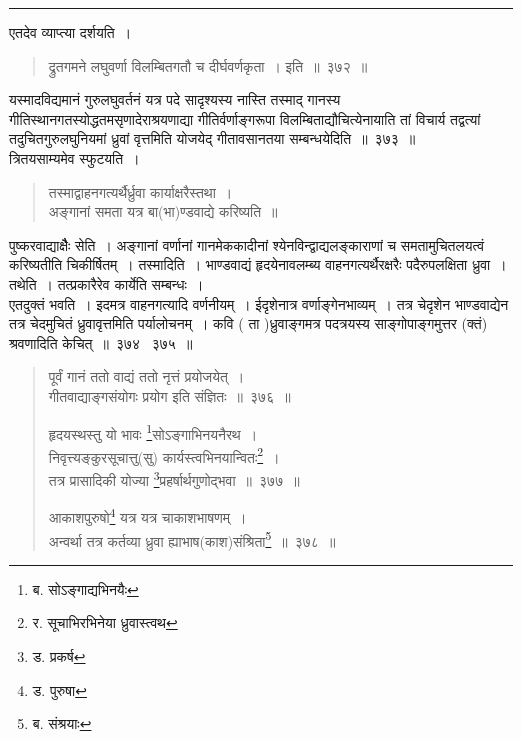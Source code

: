 \documentclass[11pt, openany]{book}
\begin{document}
\hrule

\vspace{2mm}
एतदेव व्याप्त्या दर्शयति~। 

\begin{quote}
{\qt द्रुतगमने लघुवर्णा विलम्बितगतौ च दीर्घवर्णकृता~। इति~॥~३७२~॥}
\end{quote}

यस्मादविद्यमानं गुरुलघुवर्तनं यत्र पदे सादृश्यस्य नास्ति {\qtt तस्माद्} गानस्य गीतिस्थानगतस्योद्धतमसृणादेराश्रयणाद्या गीतिर्वर्णाङ्गरूपा विलम्बिताद्यौचित्येनायाति तां विचार्य तद्वत्यां तदुचितगुरुलघुनियमां ध्रुवां वृत्तमिति योजयेद् गीतावसानतया सम्बन्धयेदिति~॥~३७३~॥\\

 त्रितयसाम्यमेव स्फुटयति~। \\

\begin{quote}
{\qt तस्माद्वाहनगत्यर्थैर्ध्रुवा कार्याक्षरैस्तथा~। \\
 अङ्गानां समता यत्र बा(भा)ण्डवाद्ये करिष्यति~॥}
\end{quote}

पुष्करवाद्याक्षैैः सेति~। {\qtt अङ्गानां} वर्णानां गानमेककादीनां श्येनविन्द्वाद्यलङ्काराणां च {\qtt समतामुचितल}यत्वं करिष्यतीति चिकीर्षितम्~। {\qtt तस्मादिति}~। भाण्डवाद्यं हृदयेनावलम्ब्य वाहनगत्यर्थैरक्षरैः पदैरुपलक्षिता ध्रुवा~। तथेति~। तत्प्रकारैरेव {\qtt कार्येति} सम्बन्धः~।\\

एतदुक्तं भवति~। इदमत्र वाहनगत्यादि वर्णनीयम्~। ईदृशेनात्र वर्णाङ्गेनभाव्यम्~। तत्र चेदृशेन भाण्डवाद्येन तत्र चेदमुचितं ध्रुवावृत्तमिति पर्यालोचनम्~। कवि ( ता )ध्रुवाङ्गमत्र पदत्रयस्य साङ्गोपाङ्गमुत्तर (क्तं) श्रवणादिति केचित्~॥~३७४ \textendash\ ३७५~॥

\newpage

\begin{quote}
{\na पूर्वं गानं ततो वाद्यं ततो नृत्तं प्रयोजयेत्~।\\
 गीतवाद्याङ्गसंयोगः प्रयोग इति संज्ञितः~॥~३७६~॥
 
 हृदयस्थस्तु यो भावः \renewcommand{\thefootnote}{1}\footnote{ब. सोऽङ्गाद्यभिनयैः}सोऽङ्गाभिनयनैरथ~।\\
 निवृत्त्यङ्कुरसूचात्तु(सु) कार्यस्त्वभिनयान्वितः\renewcommand{\thefootnote}{2}\footnote{र. सूचाभिरभिनेया ध्रुवास्त्वथ}~।\\
 तत्र प्रासादिकी योज्या \renewcommand{\thefootnote}{3}\footnote{ड. प्रकर्ष}प्रहर्षार्थगुणोद्भवा~॥~३७७~॥

 आकाशपुरुषो\renewcommand{\thefootnote}{4}\footnote{ड. पुरुषा} यत्र यत्र चाकाशभाषणम्~।\\
 अन्वर्था तत्र कर्तव्या ध्रुवा ह्याभाष(काश)संश्रिता\renewcommand{\thefootnote}{5}\footnote{ब. संश्रयाः}~॥~३७८~॥}
\end{quote}
\end{document}
